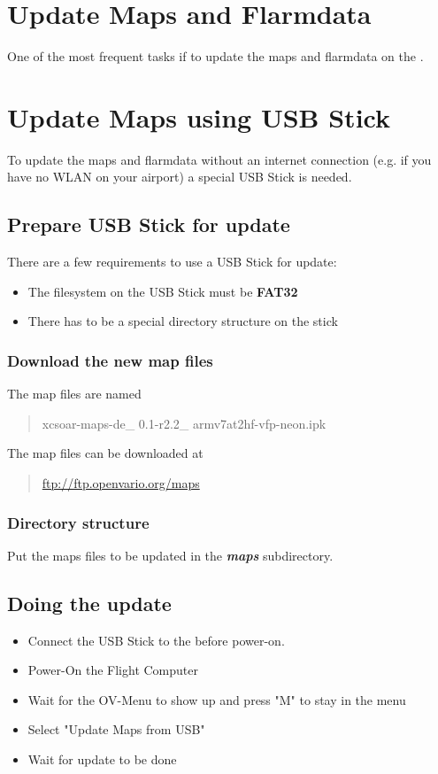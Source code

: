 \chapter{Update Maps and Flarmdata}\label{cha:upd}
One of the most frequent tasks if to update the maps and flarmdata on the \ovfc.

\chapter{Update Maps using USB Stick}\label{cha:upd_maps_usb}
To update the maps and flarmdata without an internet connection (e.g. if you have no 
WLAN on your airport) a special USB Stick is needed.

\section{Prepare USB Stick for update}
There are a few requirements to use a USB Stick for update:
\begin{itemize}
\item The filesystem on the USB Stick must be \textbf{FAT32}
\item There has to be a special directory structure on the stick
\end{itemize}

\subsection{Download the new map files}
The map files are named 
\begin{quote}
	xcsoar-maps-de\_ 0.1-r2.2\_ armv7at2hf-vfp-neon.ipk
\end{quote}

The map files can be downloaded at 
\begin{quote}
\url{ftp://ftp.openvario.org/maps}
\end{quote}

\subsection{Directory structure}

Put the maps files to be updated in the \textsl{\textbf{maps}} subdirectory.

\section{Doing the update}
\begin{itemize}
	\item Connect the USB Stick to the \ovfc before power-on.
	\item Power-On the Flight Computer
	\item Wait for the OV-Menu to show up and press "M" to stay in the menu
	\item Select "Update Maps from USB"
	\item Wait for update to be done
\end{itemize}

